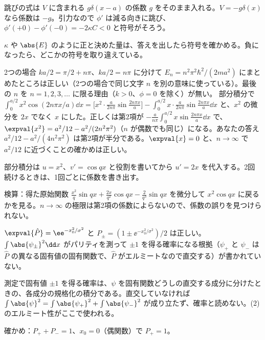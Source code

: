 \begin{rikai}
  \item 跳びの式は $V$ に含まれる $g\delta(x-a)$ の係数 $g$ をそのまま入れる。$V=-g\delta(x)$ なら係数は $-g$。引力なので $\phi'$ は減る向きに跳び、$\phi'(+0)-\phi'(-0)=-2\kappa C<0$ と符号がそろう。
  \item $\kappa$ や $\abs{E}$ のように正と決めた量は、答えを出したら符号を確かめる。負になったら、どこかの符号を取り違えている。
\end{rikai}
\begin{kotaeran}
   2つの場合 $ka/2=\pi/2+n\pi$、$ka/2=n\pi$ に分けて $E_{n}=n^{2}\pi^{2}\hbar^{2}/(2ma^{2})$ にまとめたところは正しい（2つの場合で同じ文字 $n$ を別の意味に使っている）。最後の $n$ を $n=1,2,3,\dots$ に限る理由（$k>0$、$\phi=0$ を除く）が無い。
   部分積分で $\int_{0}^{a/2}x^{2}\cos(2n\pi x/a)\dd x=\bigl[x^{2}\cdot\frac{a}{2n\pi}\sin\frac{2n\pi x}{a}\bigr]-\int_{0}^{a/2}x\cdot\frac{a}{2n\pi}\sin\frac{2n\pi x}{a}\dd x$ と、$x^{2}$ の微分を $2x$ でなく $x$ にした。正しくは第2項が $-\frac{a}{n\pi}\int_{0}^{a/2}x\sin\frac{2n\pi x}{a}\dd x$ で、$\expval{x^{2}}=a^{2}/12-a^{2}/(2n^{2}\pi^{2})$（$n$ が偶数でも同じ）になる。あなたの答え $a^{2}/12-a^{2}/(4n^{2}\pi^{2})$ は第2項が半分である。$\expval{x}=0$ と、$n\to\infty$ で $a^{2}/12$ に近づくことの確かめは正しい。
\end{kotaeran}
\begin{rikai}
  \item 部分積分は $u=x^{2}$、$v'=\cos qx$ と役割を書いてから $u'=2x$ を代入する。2回続けるときは、1回ごとに係数を書き出す。
  \item 検算：得た原始関数 $\frac{x^{2}}{q}\sin qx+\frac{2x}{q^{2}}\cos qx-\frac{2}{q^{3}}\sin qx$ を微分して $x^{2}\cos qx$ に戻るかを見る。$n\to\infty$ の極限は第2項の係数によらないので、係数の誤りを見つけられない。
\end{rikai}
\begin{kotaeran}
   $\expval{\hat{P}}=\ee^{-x_{0}^{2}/\sigma^{2}}$ と $P_{\pm}=(1\pm\ee^{-x_{0}^{2}/\sigma^{2}})/2$ は正しい。$\int\abs{\psi_{\pm}}^{2}\dd x$ がパリティを測って $\pm1$ を得る確率になる根拠（$\psi_{+}$ と $\psi_{-}$ は $\hat{P}$ の異なる固有値の固有関数で、$\hat{P}$ がエルミートなので直交する）が書かれていない。
\end{kotaeran}
\begin{rikai}
  \item 測定で固有値 $\pm1$ を得る確率は、$\psi$ を固有関数どうしの直交する成分に分けたときの、各成分の規格化の積分である。直交していなければ $\int\abs{\psi}^{2}=\int\abs{\psi_{+}}^{2}+\int\abs{\psi_{-}}^{2}$ が成り立たず、確率と読めない。(2) のエルミート性がここで使われる。
  \item 確かめ：$P_{+}+P_{-}=1$、$x_{0}=0$（偶関数）で $P_{+}=1$。
\end{rikai}
